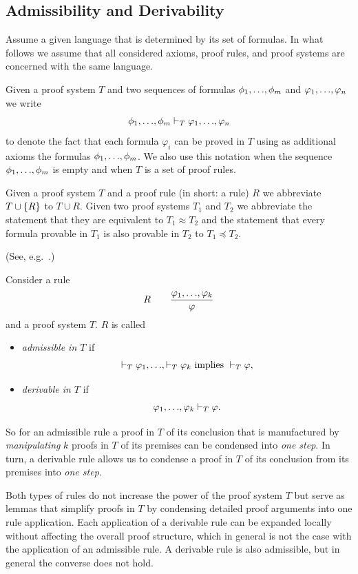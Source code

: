 \documentclass[manuscript, screen, review]{acmart}
\begin{document}
\subsection{Admissibility and Derivability}

Assume a given language that is determined by its set of formulas.  In
what follows we assume that all considered axioms, proof rules, and
proof systems are concerned with the same language.

Given a proof system $T$ and two sequences of formulas
$\phi_1, \mbox{$\ldots$}, \phi_m$ and $\varphi_1, \mbox{$\ldots$}, \varphi_n$ we write
\[
  \phi_1, \mbox{$\ldots$}, \phi_m \vdash_T \varphi_1, \mbox{$\ldots$}, \varphi_n
\]
to denote the fact that each formula $\varphi_i$ can be proved in
$T$ using as additional axioms the formulas
$\phi_1, \mbox{$\ldots$}, \phi_m$.  We also use this notation when the sequence
$\phi_1, \mbox{$\ldots$}, \phi_m$ is empty and when $T$ is a set of proof
rules.

Given a proof system $T$ and a proof rule (in short: a rule) $R$ we
abbreviate $T \cup \mbox{$\{{R}\}$}$ to $T \cup R$. Given two proof systems $T_1$
and $T_2$ we abbreviate the statement that they are equivalent to
$T_1 \approx T_2$ and the statement that every formula provable in
$T_1$ is also provable in $T_2$ to $T_1 \preceq T_2$.

\begin{definition}(See, e.g.~\cite[page 47]{Pla13}.)
  
  Consider a rule
  \[ 
  R \qquad \frac{\varphi_1,\mbox{$\ldots$},\varphi_k}{\varphi}
\]
and a proof system $T$. $R$ is called
\begin{itemize}
\item \emph{admissible in $T$} if 
\[
 \vdash_T \varphi_1, \mbox{$\ldots$}, \vdash_T \varphi_k
 \mbox{ implies }
 \vdash_T \varphi,
\]

\item \emph{derivable in $T$} if 
\[
 \varphi_1, \mbox{$\ldots$}, \varphi_k \vdash_T \varphi.
\]

\end{itemize}

\end{definition}

So for an admissible rule a proof in $T$ of its conclusion 
that is manufactured by \emph{manipulating} $k$ proofs in $T$ 
of its premises can be condensed into \emph{one step}. 
In turn, a derivable rule allows us to condense a proof in $T$ of
its conclusion from its premises into \emph{one step}.

Both types of rules do not increase the power of the proof system $T$
but serve as lemmas that simplify proofs in $T$ by condensing detailed
proof arguments into one rule application.  Each application of a
derivable rule can be expanded locally without affecting the overall
proof structure, which in general is not the case with the application
of an admissible rule.  A derivable rule is also admissible, but in
general the converse does not hold.
\end{document}
